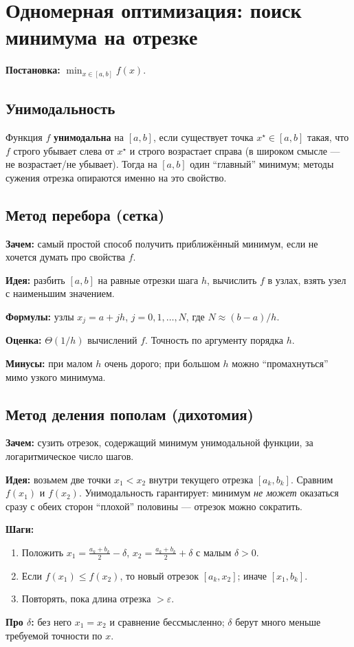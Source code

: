 \documentclass[12pt,a4paper]{article}
\begin{document}
\section[Одномерная оптимизация]{Одномерная оптимизация: поиск минимума на отрезке}
\textbf{Постановка:} \(\min_{x\in[a,b]} f(x)\).

\subsection{Унимодальность}
Функция \(f\) \textbf{унимодальна} на \([a,b]\), если существует точка \(x^\star\in[a,b]\) такая, что \(f\) строго убывает слева от \(x^\star\) и строго возрастает справа (в широком смысле --- не возрастает/не убывает). Тогда на \([a,b]\) один ``главный'' минимум; методы сужения отрезка опираются именно на это свойство.

\subsection{Метод перебора (сетка)}
\textbf{Зачем:} самый простой способ получить приближённый минимум, если не хочется думать про свойства \(f\).

\textbf{Идея:} разбить \([a,b]\) на равные отрезки шага \(h\), вычислить \(f\) в узлах, взять узел с наименьшим значением.

\textbf{Формулы:} узлы \(x_j=a+jh\), \(j=0,1,\ldots,N\), где \(N\approx (b-a)/h\).

\textbf{Оценка:} \(\Theta(1/h)\) вычислений \(f\). Точность по аргументу порядка \(h\).

\textbf{Минусы:} при малом \(h\) очень дорого; при большом \(h\) можно ``промахнуться'' мимо узкого минимума.

\subsection{Метод деления пополам (дихотомия)}
\textbf{Зачем:} сузить отрезок, содержащий минимум унимодальной функции, за логаритмическое число шагов.

\textbf{Идея:} возьмем две точки \(x_1<x_2\) внутри текущего отрезка \([a_k,b_k]\). Сравним \(f(x_1)\) и \(f(x_2)\). Унимодальность гарантирует: минимум \emph{не может} оказаться сразу с обеих сторон ``плохой'' половины --- отрезок можно сократить.

\textbf{Шаги:}
\begin{enumerate}
  \item Положить \(x_1=\frac{a_k+b_k}{2}-\delta\), \(x_2=\frac{a_k+b_k}{2}+\delta\) с малым \(\delta>0\).
  \item Если \(f(x_1)\le f(x_2)\), то новый отрезок \([a_k,x_2]\); иначе \([x_1,b_k]\).
  \item Повторять, пока длина отрезка \(>\varepsilon\).
\end{enumerate}
\textbf{Про \(\delta\):} без него \(x_1=x_2\) и сравнение бессмысленно; \(\delta\) берут много меньше требуемой точности по \(x\).
\end{document}
